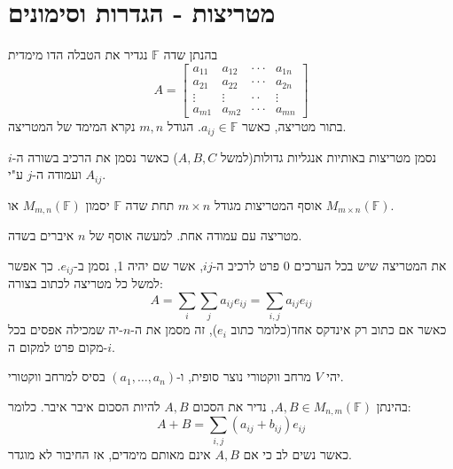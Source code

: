 \documentclass{tstextbook}
\begin{document}
\section{מטריצות - הגדרות וסימונים}

\begin{definition}
בהנתן שדה \(\mathbb{F}\) נגדיר את הטבלה הדו מימדית 
$$A=\begin{bmatrix}a_{11}&a_{12}&\cdot\cdot\cdot&a_{1n}\\ a_{21}&a_{22}&\cdot\cdot\cdot&a_{2n}\\ \vdots&\vdots&\cdot\cdot&\vdots\\ a_{m1}&a_{m2}&\cdot\cdot\cdot&a_{m n}\end{bmatrix}$$
בתור מטריצה, כאשר \(a_{ij}\in \mathbb{F}\). הגודל \(m,n\) נקרא המימד של המטריצה.

\end{definition}
\begin{symbolize}
נסמן מטריצות באותיות אנגליות גדולות(למשל \(A,B,C\)) כאשר נסמן את הרכיב בשורה ה-\(i\) ועמודה ה-\(j\) ע"י \(A_{ij}\). 

\end{symbolize}
\begin{symbolize}
אוסף המטריצות מגודל \(m\times n\) תחת שדה \(\mathbb{F}\) יסמון \(M_{m,n}\left( \mathbb{F} \right)\) או \(M_{m\times n}\left( \mathbb{F}  \right)\).

\end{symbolize}
\begin{definition}[n-יה]
מטריצה עם עמודה אחת. למעשה אוסף של \(n\) איברים בשדה.

\end{definition}
\begin{symbolize}
את המטריצה שיש בכל הערכים \(0\) פרט לרכיב ה-\(ij\), אשר שם יהיה 1, נסמן ב-\(e_{ij}\). כך אפשר למשל כל מטריצה לכתוב בצורה:
$$A=\sum_{i}\sum_{j}a_{ij}e_{ij}=\sum_{i,j}a_{ij}e_{ij}$$
כאשר אם כתוב רק אינדקס אחד(כלומר כתוב \(e_{i}\)), זה מסמן את ה-\(n\)-יה שמכילה אפסים בכל מקום פרט למקום ה-\(i\).

\end{symbolize}
\begin{definition}
יהי \(V\) מרחב ווקטורי נוצר סופית, ו-\(\left( a_{1},\dots,a_{n} \right)\) בסיס למרחב ווקטורי.

\end{definition}
\begin{definition}
בהינתן \(A,B \in M_{n,m}\left( \mathbb{F} \right)\), נדיר את הסכום \(A,B\) להיות הסכום איבר איבר. כלומר:
$$A+B=\sum_{i,j}(a_{i j}+b_{i j})e_{ij}$$
כאשר נשים לב כי אם \(A,B\) אינם מאותם מימדים, אז החיבור לא מוגדר.

\end{definition}
\end{document}
